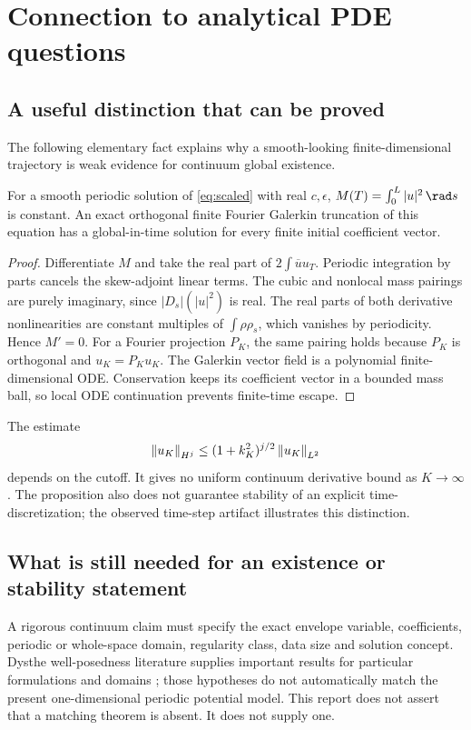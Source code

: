\section{Connection to analytical PDE questions}\label{sec:analysis}
\subsection{A useful distinction that can be proved}
The following elementary fact explains why a smooth-looking finite-dimensional trajectory is weak evidence for continuum global existence.
\begin{proposition}
For a smooth periodic solution of \eqref{eq:scaled} with real $c,\epsilon$, $M(T)=\int_0^L|u|^2\,\rad s$ is constant. An exact orthogonal finite Fourier Galerkin truncation of this equation has a global-in-time solution for every finite initial coefficient vector.
\end{proposition}
\begin{proof}
Differentiate $M$ and take the real part of $2\int\overline u u_T$. Periodic integration by parts cancels the skew-adjoint linear terms. The cubic and nonlocal mass pairings are purely imaginary, since $|D_s|(|u|^2)$ is real. The real parts of both derivative nonlinearities are constant multiples of $\int\rho\rho_s$, which vanishes by periodicity. Hence $M'=0$. For a Fourier projection $P_K$, the same pairing holds because $P_K$ is orthogonal and $u_K=P_Ku_K$. The Galerkin vector field is a polynomial finite-dimensional ODE. Conservation keeps its coefficient vector in a bounded mass ball, so local ODE continuation prevents finite-time escape.
\end{proof}
The estimate
\[
 \left\lVert u_K\right\rVert_{H^j}\le(1+k_K^2)^{j/2}\left\lVert u_K\right\rVert_{L^2}
\]
depends on the cutoff. It gives no uniform continuum derivative bound as $K\to\infty$. The proposition also does not guarantee stability of an explicit time-discretization; the observed time-step artifact illustrates this distinction.

\subsection{What is still needed for an existence or stability statement}
A rigorous continuum claim must specify the exact envelope variable, coefficients, periodic or whole-space domain, regularity class, data size and solution concept. Dysthe well-posedness literature supplies important results for particular formulations and domains \cite{grande,mosincat,heller}; those hypotheses do not automatically match the present one-dimensional periodic potential model. This report does not assert that a matching theorem is absent. It does not supply one.

